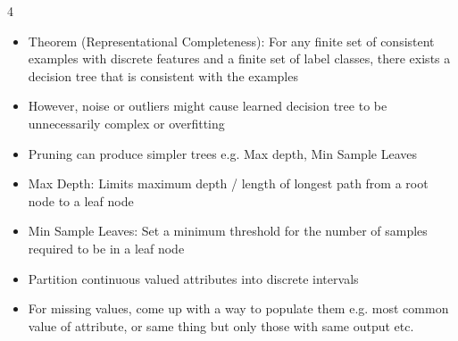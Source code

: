 \documentclass[10pt, landscape]{article}
\begin{document}
\begin{multicols*}{4}
\begin{itemize}
    \item Theorem (Representational Completeness): For any finite set of consistent examples with discrete features and a finite set of label classes, there exists a decision tree that is consistent with the examples
    \item However, noise or outliers might cause learned decision tree to be unnecessarily complex or overfitting
    \item Pruning can produce simpler trees e.g. Max depth, Min Sample Leaves
    \item Max Depth: Limits maximum depth / length of longest path from a root node to a leaf node
    \item Min Sample Leaves: Set a minimum threshold for the number of samples required to be in a leaf node
    \item Partition continuous valued attributes into discrete intervals
    \item For missing values, come up with a way to populate them e.g. most common value of attribute, or same thing but only those with same output etc.
\end{itemize}


\end{multicols*}
\end{document}
